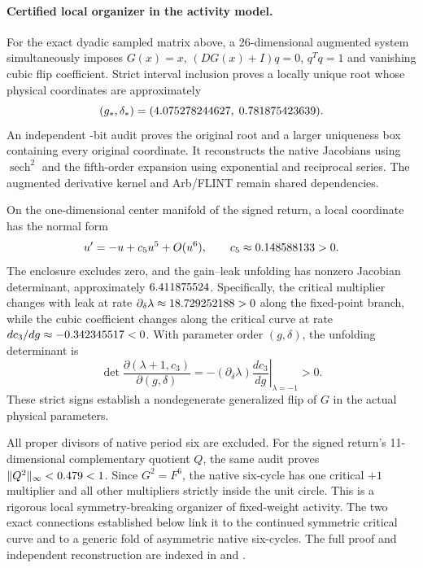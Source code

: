 \documentclass[11pt,letterpaper]{article}
\begin{document}
\paragraph{Certified local organizer in the activity model.}
For the exact dyadic sampled matrix above, a 26-dimensional augmented system
simultaneously imposes $G(x)=x$, $(DG(x)+I)q=0$, $q^Tq=1$ and vanishing
cubic flip coefficient. Strict interval inclusion proves a locally unique root
whose physical coordinates are approximately
\[
 (g_*,\delta_*)=(4.075278244627,\;0.781875423639).
\]
An independent \nRNNOrganizerPrecision{}-bit audit proves the original root
and a larger uniqueness box containing every original coordinate. It
reconstructs the native Jacobians using $\operatorname{sech}^2$ and the
fifth-order expansion using exponential and reciprocal series. The augmented
derivative kernel and Arb/FLINT remain shared dependencies.

On the one-dimensional center manifold of the signed return, a local
coordinate has the normal form
\[
 u'=-u+c_5u^5+O(u^6),\qquad c_5\approx0.148588133>0.
\]
The enclosure excludes zero, and the gain--leak unfolding has nonzero
Jacobian determinant, approximately $6.411875524$. Specifically,
the critical multiplier changes with leak at rate
$\partial_\delta\lambda\approx18.729252188>0$ along the
fixed-point branch, while the cubic coefficient changes along the critical
curve at rate $dc_3/dg\approx-0.342345517<0$. With parameter order
$(g,\delta)$, the unfolding determinant is
\[
 \det\frac{\partial(\lambda+1,c_3)}{\partial(g,\delta)}
 =-(\partial_\delta\lambda)\left.\frac{dc_3}{dg}\right|_{\lambda=-1}>0.
\]
These strict signs establish a nondegenerate generalized flip of $G$ in the
actual physical parameters.

All proper divisors of native period six are excluded. For the signed
return's 11-dimensional complementary quotient $Q$, the same audit proves
$\|Q^2\|_\infty<0.479<1$. Since $G^2=F^6$, the native
six-cycle has one critical $+1$ multiplier and all other multipliers strictly
inside the unit circle. This is a rigorous local symmetry-breaking organizer
of fixed-weight activity. The two exact connections established below link it to
the continued symmetric critical curve and to a generic fold of asymmetric
native six-cycles.
The full proof and independent reconstruction are indexed in
 and
.
\end{document}

